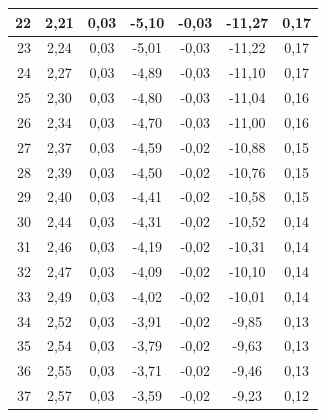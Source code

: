 \documentclass[polish, 11pt, a4paper]{article}
\begin{document}
\begin{table}[H]
\begin{tabular}{|r|c|c|c|c|c|c|}
				22	&	2,21	&	0,03	&	-5,10	&	-0,03	&	-11,27	&	0,17	\\\hline
				23	&	2,24	&	0,03	&	-5,01	&	-0,03	&	-11,22	&	0,17	\\\hline
				24	&	2,27	&	0,03	&	-4,89	&	-0,03	&	-11,10	&	0,17	\\\hline
				25	&	2,30	&	0,03	&	-4,80	&	-0,03	&	-11,04	&	0,16	\\\hline
				26	&	2,34	&	0,03	&	-4,70	&	-0,03	&	-11,00	&	0,16	\\\hline
				27	&	2,37	&	0,03	&	-4,59	&	-0,02	&	-10,88	&	0,15	\\\hline
				28	&	2,39	&	0,03	&	-4,50	&	-0,02	&	-10,76	&	0,15	\\\hline
				29	&	2,40	&	0,03	&	-4,41	&	-0,02	&	-10,58	&	0,15	\\\hline
				30	&	2,44	&	0,03	&	-4,31	&	-0,02	&	-10,52	&	0,14	\\\hline
				31	&	2,46	&	0,03	&	-4,19	&	-0,02	&	-10,31	&	0,14	\\\hline
				32	&	2,47	&	0,03	&	-4,09	&	-0,02	&	-10,10	&	0,14	\\\hline
				33	&	2,49	&	0,03	&	-4,02	&	-0,02	&	-10,01	&	0,14	\\\hline
				34	&	2,52	&	0,03	&	-3,91	&	-0,02	&	-9,85	&	0,13	\\\hline
				35	&	2,54	&	0,03	&	-3,79	&	-0,02	&	-9,63	&	0,13	\\\hline
				36	&	2,55	&	0,03	&	-3,71	&	-0,02	&	-9,46	&	0,13	\\\hline
				37	&	2,57	&	0,03	&	-3,59	&	-0,02	&	-9,23	&	0,12	\\\hline
			\end{tabular}
		\end{table}
\end{document}
